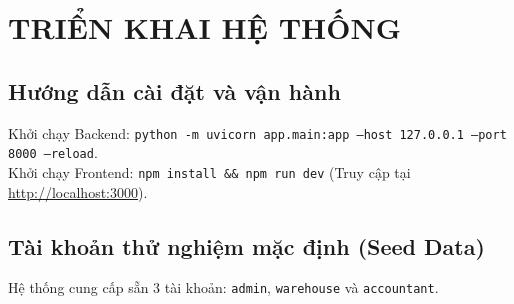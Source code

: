 \chapter{TRIỂN KHAI HỆ THỐNG}
\label{ch:12}

\section{Hướng dẫn cài đặt và vận hành}
Khởi chạy Backend: \texttt{python -m uvicorn app.main:app --host 127.0.0.1 --port 8000 --reload}.\\
Khởi chạy Frontend: \texttt{npm install \&\& npm run dev} (Truy cập tại \url{http://localhost:3000}).

\section{Tài khoản thử nghiệm mặc định (Seed Data)}
Hệ thống cung cấp sẵn 3 tài khoản: \texttt{admin}, \texttt{warehouse} và \texttt{accountant}.
